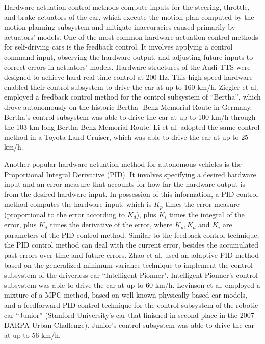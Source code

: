 Hardware actuation control methods compute inputs for the steering, throttle,
and brake actuators of the car, which execute the motion plan computed by the
motion planning subsystem and mitigate inaccuracies caused primarily by
actuators’ models. One of the most common hardware actuation control methods for
self-driving cars is the feedback control. It involves applying a control
command input, observing the hardware output, and adjusting future inputs to
correct errors in actuators’ models. Hardware structures of the Audi TTS were
designed to achieve hard real-time control at 200 Hz. This high-speed hardware
enabled their control subsystem to drive the car at up to 160 km/h. Ziegler et
al. \cite{ZIE14a} employed a feedback control method for the control subsystem
of “Bertha”, which drove autonomously on the historic Bertha-
Benz-Memorial-Route in Germany. Bertha’s control subsystem was able to drive the
car at up to 100 km/h through the 103 km long Bertha-Benz-Memorial-Route. Li et
al. \cite{LI17} adopted the same control method in a Toyota Land Cruiser, which
was able to drive the car at up to 25 km/h.

Another popular hardware actuation method for autonomous vehicles is the
Proportional Integral Derivative (PID). It involves specifying a desired
hardware input and an error measure that accounts for how far the hardware
output is from the desired hardware input. In possession of this
information, a PID control method computes the hardware input, which is $K_p$
times the error measure (proportional to the error according to $K_d$), plus $K_i$
times the integral of the error, plus $K_d$ times the derivative of the error,
where $K_p, K_d$ and $K_i$ are parameters of the PID control method. Similar to
the feedback control technique, the PID control method can deal with the current
error, besides the accumulated past errors over time and future errors.
Zhao et al. \cite{ZHA12} used an adaptive PID method based on the generalized minimum
variance technique to implement the control subsystem of the driverless car
``Intelligent Pionner". Intelligent Pionner’s control subsystem was able to drive
the car at up to 60 km/h. Levinson et al. employed a mixture of a MPC
method, based on well-known physically based car models, and a feedforward PID
control technique for the control subsystem of the robotic car “Junior” \cite{MON08}
(Stanford University’s car that finished in second place in the 2007 DARPA Urban
Challenge). Junior’s control subsystem was able to drive the car at up to 56
km/h.